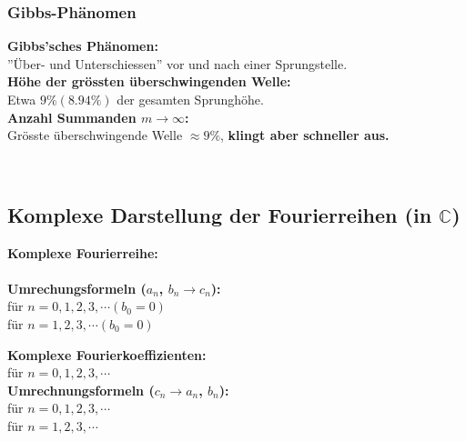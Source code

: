 			\subsubsection{Gibbs-Phänomen}
				\begin{minipage}[b]{0.65\textwidth}
					\textbf{Gibbs'sches Phänomen:}\\[3pt]
					''Über- und Unterschiessen'' vor und nach einer Sprungstelle.\\[3pt]
					\textbf{Höhe der grössten überschwingenden Welle:}\\[3pt]
					Etwa $9\% (8.94\%)$ der gesamten Sprunghöhe.\\[3pt]
					\textbf{Anzahl Summanden $m \rightarrow \infty$:}\\[3pt]
					Grösste überschwingende Welle $\approx 9\%$, \textbf{klingt aber schneller aus.}
				\end{minipage}
				\begin{minipage}[]{0.35\textwidth}
					\scalebox{0.8}{}\\[3pt]
				\end{minipage}
		
		\subsection{Komplexe Darstellung der Fourierreihen (in $\mathbb{C}$)}
			\begin{minipage}[t]{0.5\textwidth}
				\textbf{Komplexe Fourierreihe:}\\[3pt]
				\\[3pt]
				\textbf{Umrechungsformeln ($a_n$, $b_n \rightarrow c_n$):}\\[3pt]
				 für $n = 0, 1, 2, 3, \cdots (b_0 = 0)$\\[3pt]
				 für $n = 1, 2, 3, \cdots (b_0 = 0)$\\[3pt]
			\end{minipage}
			\begin{minipage}[t]{0.5\textwidth}
				\textbf{Komplexe Fourierkoeffizienten:}\\[3pt]
				 für $n = 0, 1, 2, 3, \cdots$\\[3pt]
				\textbf{Umrechnungsformeln ($c_n \rightarrow a_n$, $b_n$):}\\[3pt]
				 für $n = 0, 1, 2, 3, \cdots$\\[3pt]
				 für $n = 1, 2, 3, \cdots$\\[3pt]
			\end{minipage}
		
